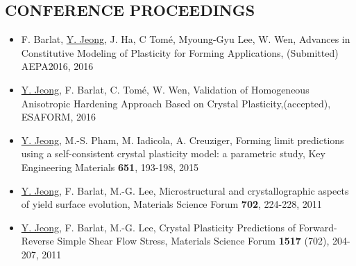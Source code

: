\documentclass{res}
\begin{document}
\begin{resume}

  \section{CONFERENCE PROCEEDINGS}
  \begin{itemize}
  \item F. Barlat, \underline{Y. Jeong}, J. Ha, C Tom\'{e}, Myoung-Gyu Lee, W. Wen, Advances in Constitutive Modeling of Plasticity for Forming Applications, (Submitted) AEPA2016, 2016
  \item \underline{Y. Jeong}, F. Barlat, C. Tom\'{e}, W. Wen, Validation of Homogeneous Anisotropic Hardening Approach Based on Crystal Plasticity,(accepted), ESAFORM, 2016
  \item \underline{Y. Jeong}, M.-S. Pham, M. Iadicola, A. Creuziger, Forming limit predictions using a self-consistent crystal plasticity model: a parametric study, Key Engineering Materials {\bf 651}, 193-198, 2015
  \item \underline{Y. Jeong}, F. Barlat, M.-G. Lee, Microstructural and crystallographic aspects of yield surface evolution, Materials Science Forum {\bf 702}, 224-228, 2011
  \item \underline{Y. Jeong}, F. Barlat, M.-G. Lee, Crystal Plasticity Predictions of Forward-Reverse Simple Shear Flow Stress, Materials Science Forum {\bf 1517} (702), 204-207, 2011
  \end{itemize}


\end{resume}
\end{document}
